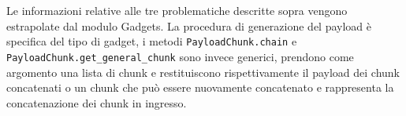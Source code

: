 Le informazioni relative alle tre problematiche descritte sopra
vengono estrapolate dal modulo Gadgets. La procedura di generazione del
payload è specifica del tipo di gadget, i metodi
\lstinline{PayloadChunk.chain} e
\lstinline{PayloadChunk.get_general_chunk} sono invece generici,
prendono come argomento una lista di chunk e restituiscono
rispettivamente il payload dei chunk concatenati o un chunk che può
essere nuovamente concatenato e rappresenta la concatenazione dei
chunk in ingresso.



